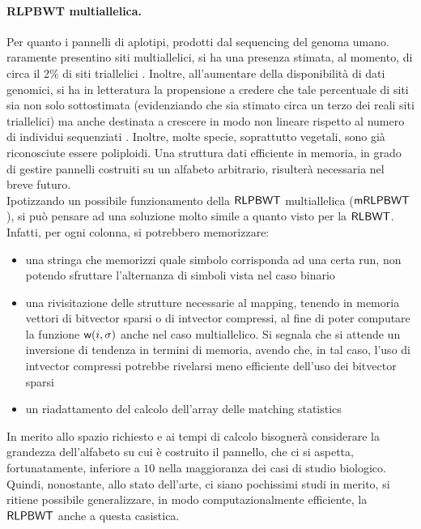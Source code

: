\paragraph{RLPBWT multiallelica.}
Per quanto i pannelli di aplotipi, prodotti dal sequencing del genoma umano.
raramente presentino siti multiallelici, si ha una presenza stimata, al momento,
di circa il 2\% di siti triallelici \cite{tri}. Inoltre, all'aumentare della
disponibilità di dati genomici, si ha in letteratura la propensione a credere
che tale percentuale di siti sia non solo sottostimata (evidenziando che sia
stimato 
circa un terzo dei reali siti triallelici) ma anche destinata a
crescere in modo non lineare rispetto al numero di individui sequenziati
\cite{tri2}. Inoltre, molte specie, soprattutto vegetali, sono già riconosciute
essere poliploidi. Una struttura dati efficiente in memoria, in grado di
gestire pannelli costruiti su un alfabeto arbitrario, risulterà necessaria nel
breve futuro.\\
Ipotizzando un possibile funzionamento della $\mbox{\rm {\sf RLPBWT}}$
multiallelica ($\mbox{\rm {\sf mRLPBWT}}$), si può pensare ad una soluzione molto
simile a quanto visto per la $\mbox{\rm {\sf RLBWT}}$. Infatti, per ogni colonna, si
potrebbero memorizzare:
\begin{itemize}
  \item una stringa che memorizzi quale simbolo corrisponda ad una certa run,
  non potendo sfruttare l'alternanza di simboli vista nel caso binario
  \item una rivisitazione delle strutture necessarie al mapping, tenendo in
  memoria vettori di bitvector sparsi o di intvector compressi, al fine di poter
  computare la funzione $\mbox{\rm {\sf w}}(i,\sigma)$ anche nel caso multiallelico. Si segnala
  che si attende un inversione di 
  tendenza in termini di memoria, avendo che, in tal caso, l'uso di intvector
  compressi potrebbe rivelarsi meno efficiente dell'uso dei bitvector sparsi 
  \item un riadattamento del calcolo dell'array delle matching statistics 
\end{itemize}
In merito allo spazio richiesto e ai tempi di calcolo bisognerà considerare la
grandezza dell'alfabeto su cui è costruito il pannello, che ci si aspetta,
fortunatamente, 
inferiore a $10$ nella maggioranza dei casi di studio biologico.\\
Quindi, nonostante, allo stato dell'arte, ci siano pochissimi studi in merito,
si ritiene 
possibile generalizzare, in modo computazionalmente efficiente, la
$\mbox{\rm {\sf RLPBWT}}$ anche a questa casistica. 
